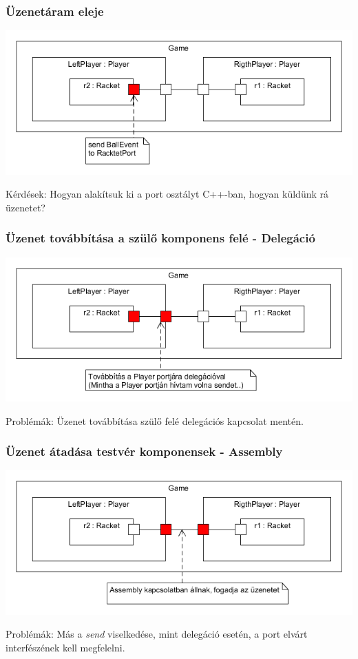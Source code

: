 \documentclass[11pt]{beamer}
\begin{document}
\begin{frame}
	\frametitle{Üzenetáram eleje}
	\includegraphics[scale=0.5]{vedes_demo_send.png}
	
	Kérdések: Hogyan alakítsuk ki a port osztályt C++-ban, hogyan küldünk rá üzenetet?
	
\end{frame}

\begin{frame}
	\frametitle{Üzenet továbbítása a szülő komponens felé - Delegáció}
	\begin{center}
	\includegraphics[scale=0.5]{vedes_demo_connect.png}
	\end{center}
	
	Problémák: Üzenet továbbítása szülő felé delegációs kapcsolat mentén.

\end{frame}


\begin{frame}
	\frametitle{Üzenet átadása testvér komponensek - Assembly}
	\begin{center}
	\includegraphics[scale=0.5]{vedes_demo_assconnect.png}
	\end{center}
	Problémák: Más a \textit{send} viselkedése, mint delegáció esetén, a port elvárt interfészének kell megfelelni. 
		
\end{frame}
\end{document}
